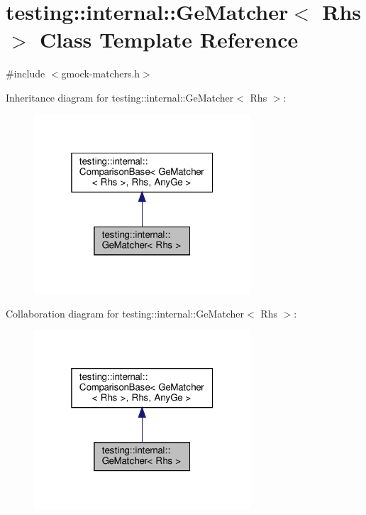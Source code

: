 \hypertarget{classtesting_1_1internal_1_1_ge_matcher}{}\section{testing\+:\+:internal\+:\+:Ge\+Matcher$<$ Rhs $>$ Class Template Reference}
\label{classtesting_1_1internal_1_1_ge_matcher}


{\ttfamily \#include $<$gmock-\/matchers.\+h$>$}



Inheritance diagram for testing\+:\+:internal\+:\+:Ge\+Matcher$<$ Rhs $>$\+:
\nopagebreak
\begin{figure}[H]
\begin{center}
\leavevmode
\includegraphics[width=229pt]{classtesting_1_1internal_1_1_ge_matcher__inherit__graph}
\end{center}
\end{figure}


Collaboration diagram for testing\+:\+:internal\+:\+:Ge\+Matcher$<$ Rhs $>$\+:
\nopagebreak
\begin{figure}[H]
\begin{center}
\leavevmode
\includegraphics[width=229pt]{classtesting_1_1internal_1_1_ge_matcher__coll__graph}
\end{center}
\end{figure}

